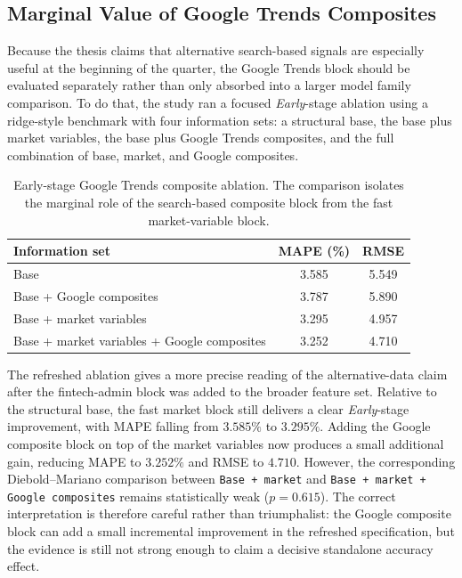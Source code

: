 \documentclass[12pt,a4paper]{article}
\begin{document}
\subsection{Marginal Value of Google Trends Composites}

Because the thesis claims that alternative search-based signals are especially useful at the beginning of the quarter, the Google Trends block should be evaluated separately rather than only absorbed into a larger model family comparison. To do that, the study ran a focused \textit{Early}-stage ablation using a ridge-style benchmark with four information sets: a structural base, the base plus market variables, the base plus Google Trends composites, and the full combination of base, market, and Google composites.

\begin{table}[H]
    \centering
    \small
    \caption{Early-stage Google Trends composite ablation. The comparison isolates the marginal role of the search-based composite block from the fast market-variable block.}
    \label{tab:google_ablation}
    \begin{tabular}{lcc}
        \hline
        Information set & MAPE (\%) & RMSE \\
        \hline
        Base & 3.585 & 5.549 \\
        Base + Google composites & 3.787 & 5.890 \\
        Base + market variables & 3.295 & 4.957 \\
        Base + market variables + Google composites & 3.252 & 4.710 \\
        \hline
    \end{tabular}
\end{table}

The refreshed ablation gives a more precise reading of the alternative-data claim after the fintech-admin block was added to the broader feature set. Relative to the structural base, the fast market block still delivers a clear \textit{Early}-stage improvement, with MAPE falling from $3.585\%$ to $3.295\%$. Adding the Google composite block on top of the market variables now produces a small additional gain, reducing MAPE to $3.252\%$ and RMSE to $4.710$. However, the corresponding Diebold--Mariano comparison between \texttt{Base + market} and \texttt{Base + market + Google composites} remains statistically weak ($p = 0.615$). The correct interpretation is therefore careful rather than triumphalist: the Google composite block can add a small incremental improvement in the refreshed specification, but the evidence is still not strong enough to claim a decisive standalone accuracy effect.
\end{document}
